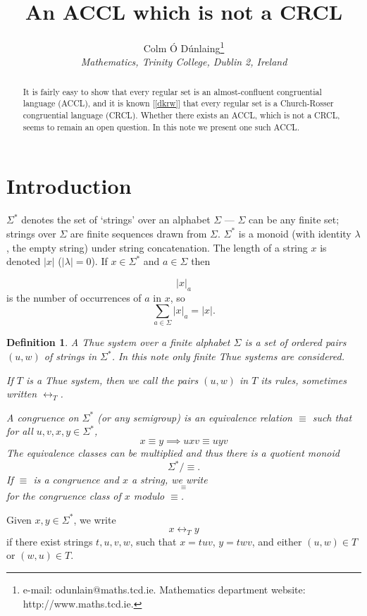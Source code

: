 \documentclass[12pt,a4paper]{article}
\title{An ACCL which is not a CRCL}
\author{Colm \'O D\'unlaing\thanks{e-mail: odunlain@maths.tcd.ie.
Mathematics department website: http://www.maths.tcd.ie.}\\
{\em Mathematics, Trinity College, Dublin 2, Ireland}}
\newtheorem{definition}[theorem]{Definition}
\numberwithin{equation}{section}
\newcommand{\be}{\begin{equation*}}
\newcommand{\ee}{\end{equation*}}
\begin{document}
\maketitle
\begin{abstract}
It is fairly easy to show that every regular set is
an almost-confluent congruential language (ACCL), and it
is known [\ref{dkrw}] that every regular set
is a Church-Rosser congruential language (CRCL).
Whether there exists an ACCL, which is not a CRCL, seems to remain
an open question.  In this note we present one such ACCL.
\end{abstract}

\section{Introduction}

$\Sigma^*$ denotes the set of `strings' over an alphabet
$\Sigma$ --- $\Sigma$ can be any finite set;
strings over $\Sigma$ are finite sequences drawn from $\Sigma$.
$\Sigma^*$ is a  monoid (with identity $\lambda$, the empty string)
under string concatenation.
The length of a string $x$ is denoted $|x|$ ($|\lambda|=0$).
If $x\in \Sigma^*$ and $a\in \Sigma$ then

\be
|x|_a
\ee
is the number of occurrences of $a$ in $x$, so
\be
\sum_{a \in \Sigma} |x|_a = |x|.
\ee


\begin{definition}
\label{def: thue congruence}
A {\em Thue system} over a finite alphabet $\Sigma$
is a set of ordered pairs $(u,w)$ of strings
in $\Sigma^*$.
In this note only finite Thue systems are considered.


If $T$ is a Thue system, then we call the pairs
$(u,w)$ in $T$ its {\em rules}, sometimes written
$\leftrightarrow_T$.

A {\em congruence} on $\Sigma^*$ (or any semigroup) is
an equivalence relation $\equiv$ such that
for all $u,v,x,y \in \Sigma^*$,
\be
x\equiv y\implies uxv \equiv uyv
\ee
The equivalence classes can be multiplied and
thus there is a quotient monoid
\be
\Sigma^* / \equiv .
\ee
If $\equiv$ is a congruence and $x$ a string, we write
\be
[x]_\equiv
\ee
for the congruence class of $x$ modulo $\equiv$.
\end{definition}

\noindent
Given $x,y\in \Sigma^*$, we write
\be
x \leftrightarrow_T y
\ee
if there exist strings $t,u,v,w$, such
that $x = tuv$, $y=twv$, and
either $(u,w)\in T$ or $(w,u)\in T$.
\end{document}

